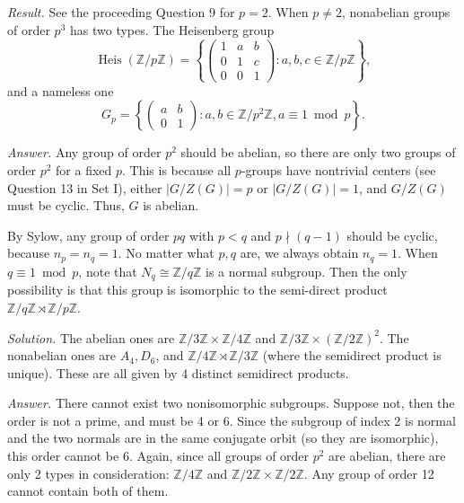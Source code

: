 \documentclass{mathproblems}
\newcommand\Z{\mathbb{Z}}
\begin{document}
\begin{questions}

\textit{Result.} 
See the proceeding Question 9 for $p=2$. When $p\neq 2$, nonabelian groups of order $p^3$ has two types. The Heisenberg group
$$
\operatorname{Heis}(\Z/p\Z)=\left\{\begin{pmatrix} 1 & a & b \\ 0 & 1 & c\\ 0 & 0 & 1\end{pmatrix}: a,b,c \in \Z/p\Z \right\},
$$
and a nameless one
$$
G_p=\left\{\begin{pmatrix}a & b\\0 & 1\end{pmatrix}: a,b \in \Z/p^2\Z, a\equiv 1\bmod p \right\}.
$$



\textit{Answer.} Any group of order $p^2$ should be abelian, so there are only two groups of order $p^2$ for a fixed $p$. This is because all $p$-groups have nontrivial centers (see Question 13 in Set I), either $|G/Z(G)|=p$ or $|G/Z(G)|=1$, and $G/Z(G)$ must be cyclic. Thus, $G$ is abelian.

By Sylow, any group of order $p q$ with $p<q$ and $p\nmid (q-1)$ should be cyclic, because $n_p=n_q=1$. No matter what $p,q$ are, we always obtain $n_q=1$. When $q\equiv 1 \bmod{p}$, note that $N_q \cong \Z/q\Z$ is a normal subgroup. Then the only possibility is that this group is isomorphic to the semi-direct product $\Z/q\Z\rtimes \Z/p\Z$. 


\textit{Solution.}
The abelian ones are $\Z/3\Z\times \Z/4\Z$ and $\Z/3\Z\times (\Z/2\Z)^{2}$. The nonabelian ones are $A_4, D_6$, and $\Z/4\Z\rtimes \Z/3\Z$ (where the semidirect product is unique). These are all given by 4 distinct semidirect products.

\textit{Answer.}
There cannot exist two nonisomorphic subgroups. Suppose not, then the order is not a prime, and must be 4 or 6. Since the subgroup of index 2 is normal and the two normals are in the same conjugate orbit (so they are isomorphic), this order cannot be 6. Again, since all groups of order $p^2$ are abelian, there are only 2 types in consideration: $\Z/4\Z$ and $\Z/2\Z\times \Z/2\Z$. Any group of order 12 cannot contain both of them.


\end{questions}
\end{document}
